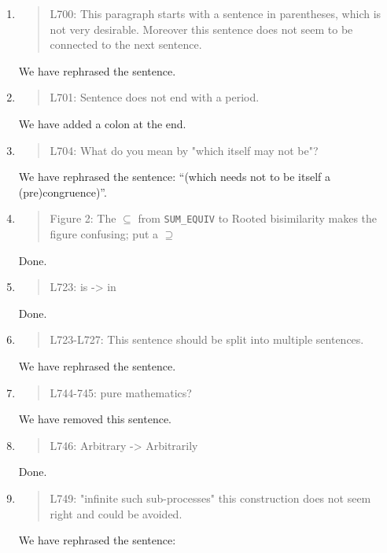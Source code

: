 \begin{enumerate}
\item \begin{quote}
    L700: This paragraph starts with a sentence in parentheses, which is not very desirable.
    Moreover this sentence does not seem to be connected to the next sentence.
  \end{quote}
  \Mark
  We have rephrased the sentence.
  
\item \begin{quote}
    L701: Sentence does not end with a period.
  \end{quote}
  \Mark
  We have added a colon at the end.
  
\item \begin{quote}
    L704: What do you mean by "which itself may not be"?
  \end{quote}
  \Mark
  We have rephrased the sentence: ``(which needs not to be itself a (pre)congruence)''.

\item \begin{quote}
    Figure 2: The $\subseteq$ from \texttt{SUM\_EQUIV} to Rooted
    bisimilarity makes the figure confusing; put a $\supseteq$
  \end{quote}
  \Mark
  Done.
  
\item \begin{quote}
    L723: is -> in
  \end{quote}
  \Mark
  Done.
  
\item \begin{quote}
    L723-L727: This sentence should be split into multiple sentences.
  \end{quote}
  \Mark
  We have rephrased the sentence.
  
\item \begin{quote}
    L744-745: pure mathematics?
  \end{quote}
  \Mark
  We have removed this sentence.
  
\item \begin{quote}
    L746: Arbitrary -> Arbitrarily
  \end{quote}
  \Mark
  Done.
  
\item \begin{quote}
    L749: "infinite such sub-processes" this construction does not seem right and could be avoided.
  \end{quote}
  \Mark
  We have rephrased the sentence: 
  

\end{enumerate}
